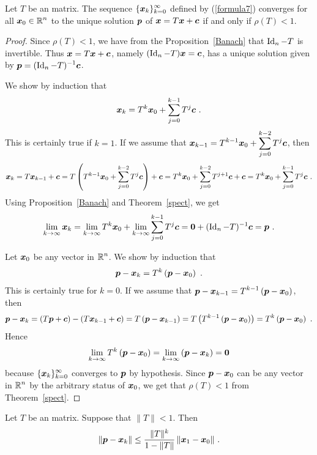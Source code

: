 \begin{theorem}
Let $T$ be an \nn matrix.  The sequence
$\displaystyle \{\bm{x}_{k}\}_{k=0}^\infty$ defined by
(\ref{formula7}) converges for all $\displaystyle \bm{x}_{0} \in \mathbb{R}^n$ to the
unique solution $\bm{p}$ of $\bm{x} = T\bm{x} + \bm{c}$ if and
only if $\rho(T) < 1$.
\label{convth}
\end{theorem}

\begin{proof}
\stage{$\Leftarrow$} Since $\rho(T) <1$, we have from the
Proposition~\ref{Banach} that $\operatorname{Id}_n-T$ is invertible.  Thus
$\bm{x} = T\bm{x} + \bm{c}$, namely $(\operatorname{Id}_n-T)\bm{x} = \bm{c}$,
has a unique solution given by $\displaystyle \bm{p} = (\operatorname{Id}_n-T)^{-1}\bm{c}$.

We show by induction that
\[
\bm{x}_{k} = T^k\bm{x}_{0} + \sum_{j=0}^{k-1} T^j \bm{c} \ .
\]
This is certainly true if $k=1$.  If we assume that
$\displaystyle 
\bm{x}_{k-1} = T^{k-1}\bm{x}_{0} + \sum_{j=0}^{k-2} T^j \bm{c}$,
then
\[
\bm{x}_{k} = T\bm{x}_{k-1} + \bm{c}
= T \left( T^{k-1}\bm{x}_{0} + \sum_{j=0}^{k-2} T^j \bm{c} \right)
+ \bm{c}
= T^k\bm{x}_{0} + \sum_{j=0}^{k-2} T^{j+1} \bm{c} + \bm{c}
= T^k\bm{x}_{0} + \sum_{j=0}^{k-1} T^j \bm{c} \ .
\]
Using Proposition~\ref{Banach} and Theorem~\ref{spect}, we get
\[
\lim_{k\rightarrow \infty} \bm{x}_{k} =
\lim_{k\rightarrow \infty} T^k\bm{x}_{0} +
\lim_{k\rightarrow \infty} \sum_{j=0}^{k-1} T^j \bm{c}
= \bm{0} + (\operatorname{Id}_n - T)^{-1}\bm{c} = \bm{p} \ .
\]

\stage{$\Rightarrow$} Let $\bm{x}_{0}$ be any vector in $\displaystyle \mathbb{R}^n$.
We show by induction that
\[
\bm{p} - \bm{x}_{k} = T^k\left(\bm{p} - \bm{x}_{0}\right) \ .
\]
This is certainly true for $k=0$.  If we assume that
$\displaystyle
\bm{p} - \bm{x}_{k-1} = T^{k-1}\left(\bm{p} - \bm{x}_{0}\right)$,
then
\[
\bm{p} - \bm{x}_{k} = \left(T\bm{p} + \bm{c}\right) -
  \left(T\bm{x}_{k-1} + \bm{c}\right)
= T \left( \bm{p} - \bm{x}_{k-1} \right)
= T \left( T^{k-1}\left(\bm{p} - \bm{x}_{0}\right)\right)
= T^k\left(\bm{p} - \bm{x}_{0}\right) \ .
\]
Hence
\[
\lim_{k\rightarrow \infty} T^k\left(\bm{p} - \bm{x}_{0}\right)
= \lim_{k\rightarrow \infty} \left(\bm{p} -\bm{x}_{k}\right)
= \bm{0}
\]
because $\displaystyle \{\bm{x}_{k}\}_{k=0}^\infty$ converges to $\bm{p}$
by hypothesis.  Since $\bm{p} - \bm{x}_{0}$ can be any vector in
$\displaystyle \mathbb{R}^n$ by the arbitrary status of $\bm{x}_0$, we get that
$\rho(T) < 1$ from Theorem~\ref{spect}. 
\end{proof}

\begin{cor}
Let $T$ be an \nn matrix.  Suppose that $\|T\| <1$.  Then
\[
\| \bm{p} - \bm{x}_{k} \| \leq \frac{\| T \|^k}{1 - \| T \|} \,
\| \bm{x}_{1} - \bm{x}_{0} \| \ .
\]
\end{cor}

